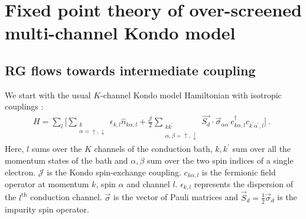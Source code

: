\documentclass[reprint,prb,superscriptaddress]{revtex4-2}
\begin{document}
\section{Fixed point theory of over-screened multi-channel Kondo model}
\label{rg_section}
\subsection{RG flows towards intermediate coupling}
\label{rg_flow_section}
We start with the usual \(K\)-channel Kondo model Hamiltonian with isotropic couplings \cite{Noz_blandin_1980}:
\begin{gather}
	\label{mc_ham}
	H = \sum_l\bigg[\sum_{\substack{k\\\alpha=\uparrow,\downarrow}}\epsilon_{k,l} \hat n_{k\alpha,l} + \frac{\mathcal{J}}{2}\sum_{\substack{kk^\prime\\\alpha,\beta= \uparrow,\downarrow}} \vec{S_d}\cdot\vec{\sigma}_{\alpha\alpha^\prime}c_{k\alpha,l}^\dagger c_{k^\prime\alpha^\prime, l}\bigg]~.~~
\end{gather}
Here, \(l\) sums over the \(K\) channels of the conduction bath, \(k,k^\prime\) sum over all the momentum states of the bath and \(\alpha,\beta\) sum over the two spin indices of a single electron. \(\mathcal{J}\) is the Kondo spin-exchange coupling. \(c_{k\alpha,l}\) is the fermionic field operator at momentum \(k\), spin \(\alpha\) and channel \(l\). \(\epsilon_{k,l}\) represents the dispersion of the \(l^\text{th}\) conduction channel. \(\vec \sigma\) is the vector of Pauli matrices and \(\vec S_d = \frac{1}{2}\vec \sigma_d\) is the impurity spin operator.
\end{document}
